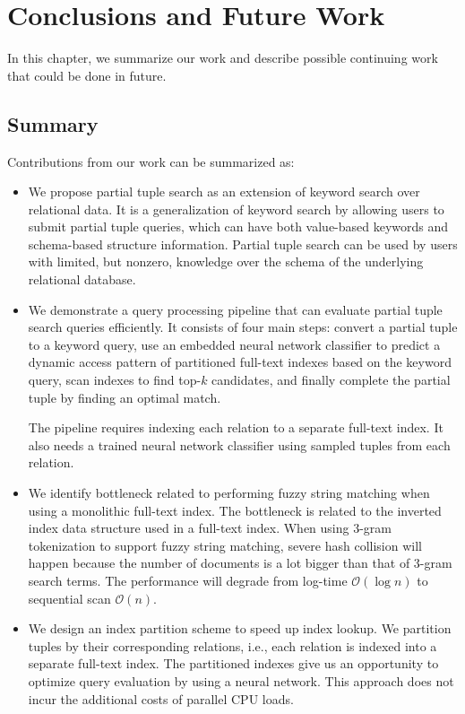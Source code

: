 \chapter{Conclusions and Future Work}
In this chapter, we summarize our work and describe possible continuing work that could be done in future.

\section{Summary}
Contributions from our work can be summarized as:
\begin{itemize}
    \item We propose partial tuple search as an extension of keyword search over relational data. It is a generalization of keyword search by allowing users to submit partial tuple queries, which can have both value-based keywords and schema-based structure information. Partial tuple search can be used by users with limited, but nonzero, knowledge over the schema of the underlying relational database.
    
    \item We demonstrate a query processing pipeline that can evaluate partial tuple search queries efficiently. 
    It consists of four main steps: convert a partial tuple to a keyword query,
    use an embedded neural network classifier to predict a dynamic access pattern of partitioned full-text indexes based on the keyword query, scan indexes to find top-$k$ candidates, and finally complete the partial tuple by finding an optimal match.
    
    The pipeline requires indexing each relation to a separate full-text index. It also needs a trained neural network classifier using sampled tuples from each relation.
    
    \item We identify bottleneck related to performing fuzzy string matching when using a monolithic full-text index. The bottleneck is related to the inverted index data structure used in a full-text index. When using $3$-gram tokenization to support fuzzy string matching, severe hash collision will happen because the number of documents is a lot bigger than that of 3-gram search terms. The performance will degrade from log-time $\mathcal{O}(\log n)$ to sequential scan $\mathcal{O}(n)$.

    \item We design an index partition scheme to speed up index lookup. We partition tuples by their corresponding relations, i.e., each relation is indexed into a separate full-text index. The partitioned indexes give us an opportunity to optimize query evaluation by using a neural network. This approach does not incur the additional costs of parallel CPU loads.
    

\end{itemize}
